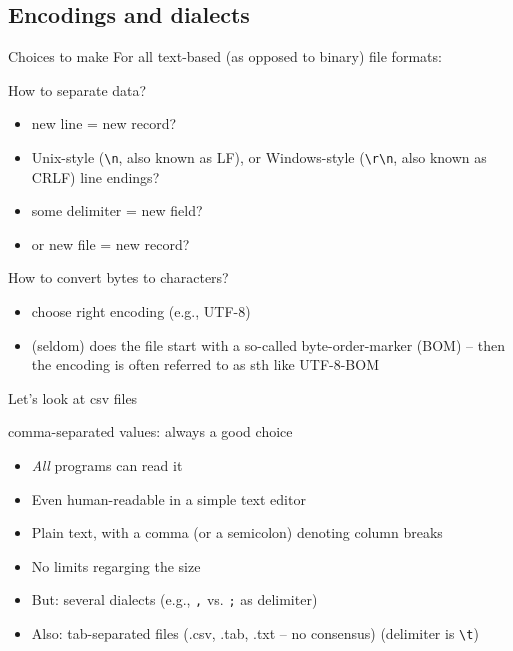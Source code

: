 \subsection{Encodings and dialects}


\begin{frame}{Choices to make}
For all text-based (as opposed to binary) file formats:
\begin{block}{How to separate data?}
	\begin{itemize}
		\item new line = new record?
		\item Unix-style (\texttt{\textbackslash n}, also known as LF),  or Windows-style (\texttt{\textbackslash r\textbackslash n}, also known as CRLF) line endings?
		\item some delimiter = new field?
		\item or new file = new record?
	\end{itemize}
\end{block}
\pause
\begin{block}{How to convert bytes to characters?}
	\begin{itemize}
		\item choose right encoding (e.g., UTF-8)
		\item (seldom) does the file start with a so-called byte-order-marker (BOM) -- then the encoding is often referred to as sth like UTF-8-BOM
	\end{itemize}
\end{block}
\end{frame}


\begin{frame}{Let's look at csv files}
	\begin{block}{comma-separated values: always a good choice}
		\begin{itemize}
			\item \emph{All} programs can read it
			\item Even human-readable in a simple text editor
			\item Plain text, with a comma (or a semicolon) denoting column breaks
			\item No limits regarging the size
			\item But: several dialects (e.g., \texttt{,} vs. \texttt{;} as delimiter)
			\item Also: tab-separated files (.csv, .tab, .txt -- no consensus) (delimiter is \texttt{\textbackslash t})
		\end{itemize}
	\end{block}
\end{frame}


